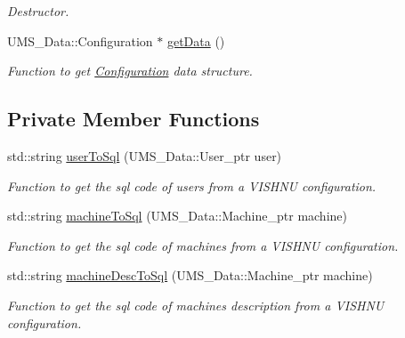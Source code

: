 \begin{DoxyCompactItemize}
\begin{DoxyCompactList}\small\item\em Destructor. \item\end{DoxyCompactList}\item 
UMS\_\-Data::Configuration $\ast$ \hyperlink{classConfigurationServer_ae1ce593072e5a6828128c5c80758604c}{getData} ()
\begin{DoxyCompactList}\small\item\em Function to get \hyperlink{classConfiguration}{Configuration} data structure. \item\end{DoxyCompactList}\end{DoxyCompactItemize}
\subsection*{Private Member Functions}
\begin{DoxyCompactItemize}
\item 
std::string \hyperlink{classConfigurationServer_a500cedb52aeaa3eb1b1f308783380375}{userToSql} (UMS\_\-Data::User\_\-ptr user)
\begin{DoxyCompactList}\small\item\em Function to get the sql code of users from a VISHNU configuration. \item\end{DoxyCompactList}\item 
std::string \hyperlink{classConfigurationServer_a4bafc7113ec51d2e371a9af35881967b}{machineToSql} (UMS\_\-Data::Machine\_\-ptr machine)
\begin{DoxyCompactList}\small\item\em Function to get the sql code of machines from a VISHNU configuration. \item\end{DoxyCompactList}\item 
std::string \hyperlink{classConfigurationServer_a10dc6a2581fce8e24144f9f49e08d58f}{machineDescToSql} (UMS\_\-Data::Machine\_\-ptr machine)
\begin{DoxyCompactList}\small\item\em Function to get the sql code of machines description from a VISHNU configuration. \item\end{DoxyCompactList}\end{DoxyCompactItemize}
